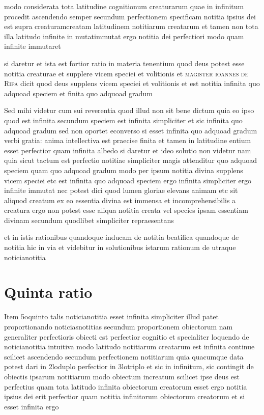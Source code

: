 \documentclass[twoside, openright]{report}
\newcommand{\name}[1]{\textsc{#1}}
\begin{document}
        \pstart
        modo considerata tota latitudine cognitionum creaturarum quae in infinitum procedit ascendendo semper secundum perfectionem specificam notitia ipsius dei est supra creaturamcreatam latitudinem notitiarum creatarum et tamen non tota illa latitudo infinite in mutatimmutat ergo notitia dei perfectiori modo quam infinite immutaret
        \pend
     
        \pstart
        si daretur et ista est fortior ratio in materia tenentium quod deus potest esse notitia creaturae et supplere vicem speciei et volitionis et \name{magister ioannes de Ripa} dicit quod deus supplens vicem speciei et volitionis et est notitia infinita quo adquoad speciem et finita quo adquoad gradum
        \pend
     
        \pstart
        Sed mihi videtur cum sui reverentia quod illud non sit bene dictum quia eo ipso quod est infinita secundum speciem est infinita simpliciter et sic infinita quo adquoad gradum sed non oportet econverso si esset infinita quo adquoad gradum verbi gratia: anima intellectiva est praecise finita et tamen in latitudine entium esset perfectior quam infinita albedo si daretur et ideo solutio non videtur nam quia sicut tactum est perfectio notitiae simpliciter magis attenditur quo adquoad speciem quam quo adquoad gradum modo per ipsum notitia divina supplens vicem speciei etc est infinita quo adquoad speciem ergo infinita simpliciter  ergo infinite immutat nec potest dici quod lumen gloriae elevans animam etc sit aliquod creatum ex eo essentia divina est immensa et incomprehensibilis a creatura ergo non potest esse aliqua notitia creata vel species ipsam essentiam divinam secundum quodlibet simpliciter  repraesentans
        \pend
     
        \pstart
        et in istis rationibus quandoque inducam de notitia beatifica quandoque de notitia hic in via et videbitur in solutionibus istarum rationum de utraque noticianotitia
        \pend
      
        \bigskip
         \section*{Quinta ratio} 
        \pstart
        Item 5oquinto talis noticianotitia esset infinita simpliciter illud patet proportionando noticiasnotitias secundum proportionem obiectorum nam generaliter perfectioris obiecti est perfectior cognitio et specialiter loquendo de noticianotitia intuitiva modo latitudo notitiarum creatarum est infinita continue scilicet ascendendo secundum perfectionem notitiarum quia quacumque data potest dari in 2loduplo perfectior in 3lotriplo et sic in infinitum, sic contingit de obiectis ipsarum notitiarum modo obiectum increatum scilicet ipse deus est perfectius quam tota latitudo infinita obiectorum creatorum esset ergo notitia ipsius dei erit perfectior quam notitia infinitorum obiectorum creatorum et si esset infinita ergo
        \pend
     
\end{document}
